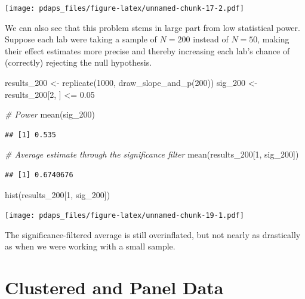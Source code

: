 \documentclass[
  12pt,
  oneside,openany]{book}
\newenvironment{Shaded}{\begin{snugshade}}{\end{snugshade}}
\newcommand{\CommentTok}[1]{\textcolor[rgb]{0.56,0.35,0.01}{\textit{#1}}}
\newcommand{\DecValTok}[1]{\textcolor[rgb]{0.00,0.00,0.81}{#1}}
\newcommand{\FloatTok}[1]{\textcolor[rgb]{0.00,0.00,0.81}{#1}}
\newcommand{\FunctionTok}[1]{\textcolor[rgb]{0.00,0.00,0.00}{#1}}
\newcommand{\NormalTok}[1]{#1}
\newcommand{\OtherTok}[1]{\textcolor[rgb]{0.56,0.35,0.01}{#1}}
\newcommand{\SpecialCharTok}[1]{\textcolor[rgb]{0.00,0.00,0.00}{#1}}
\begin{document}
\texttt{[image: pdaps\_files/figure-latex/unnamed-chunk-17-2.pdf]}

We can also see that this problem stems in large part from low statistical power. Suppose each lab were taking a sample of \(N = 200\) instead of \(N = 50\), making their effect estimates more precise and thereby increasing each lab's chance of (correctly) rejecting the null hypothesis.

\begin{Shaded}
\begin{Highlighting}[]
\NormalTok{results\_200 }\OtherTok{\textless{}{-}} \FunctionTok{replicate}\NormalTok{(}\DecValTok{1000}\NormalTok{, }\FunctionTok{draw\_slope\_and\_p}\NormalTok{(}\DecValTok{200}\NormalTok{))}
\NormalTok{sig\_200 }\OtherTok{\textless{}{-}}\NormalTok{ results\_200[}\DecValTok{2}\NormalTok{, ] }\SpecialCharTok{\textless{}=} \FloatTok{0.05}

\CommentTok{\# Power}
\FunctionTok{mean}\NormalTok{(sig\_200)}
\end{Highlighting}
\end{Shaded}

\begin{verbatim}
## [1] 0.535
\end{verbatim}

\begin{Shaded}
\begin{Highlighting}[]
\CommentTok{\# Average estimate through the significance filter}
\FunctionTok{mean}\NormalTok{(results\_200[}\DecValTok{1}\NormalTok{, sig\_200])}
\end{Highlighting}
\end{Shaded}

\begin{verbatim}
## [1] 0.6740676
\end{verbatim}

\begin{Shaded}
\begin{Highlighting}[]
\FunctionTok{hist}\NormalTok{(results\_200[}\DecValTok{1}\NormalTok{, sig\_200])}
\end{Highlighting}
\end{Shaded}

\texttt{[image: pdaps\_files/figure-latex/unnamed-chunk-19-1.pdf]}

The significance-filtered average is still overinflated, but not nearly as drastically as when we were working with a small sample.

\hypertarget{panel}{%
\chapter{Clustered and Panel Data}\label{panel}}
\end{document}
